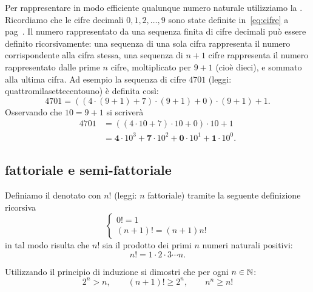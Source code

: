 Per rappresentare in modo efficiente qualunque numero naturale utilizziamo la 
.
Ricordiamo che le cifre decimali $0,1,2,\dots, 9$ sono state definite in~\eqref{eq:cifre}
a pag~\pageref{eq:cifre}.
Il numero rappresentato da una sequenza finita di cifre decimali può essere 
definito ricorsivamente: una sequenza di una sola cifra rappresenta il numero 
corrispondente alla cifra stessa, una sequenza di $n+1$ cifre rappresenta il 
numero rappresentato dalle prime $n$ cifre, moltiplicato per $9+1$ (cioè dieci),
e sommato alla ultima cifra. 
Ad esempio la sequenza di cifre $4701$ (leggi: quattromilasettecentouno)
è definita così:
\[ 
  4701 = ((4\cdot(9+1)+7)\cdot(9+1)+0)\cdot(9+1)+1.
\]
Osservando che $10 = 9+1$ si scriverà
\begin{align*}
  4701 
  & = ((4\cdot 10 + 7)\cdot 10 +0)\cdot 10 + 1 \\
  & = \mathbf 4\cdot 10^3 + \mathbf 7\cdot 10^2 + \mathbf 0\cdot 10^1 + \mathbf 1 \cdot 10^0. 
\end{align*}

\subsection{fattoriale e semi-fattoriale}

Definiamo il 
%
%
denotato con $n!$ (leggi: $n$ fattoriale) 
tramite la seguente definizione ricorsiva
\[
  \begin{cases}
    0! = 1 \\
    (n+1)! = (n+1) n!
  \end{cases}
\]
in tal modo risulta che $n!$ sia il prodotto dei primi $n$ numeri naturali positivi:
\[
  n! = 1 \cdot 2 \cdot 3 \cdots n.  
\]

\begin{exercise}
  \label{ex:6734098}%
  Utilizzando il principio di induzione
  si dimostri che per ogni $n\in {\mathbb N}$:
  \[
    2^n > n, \qquad 
    (n+1)! \ge 2^n, \qquad
    n^n \ge n!
  \]
\end{exercise}

